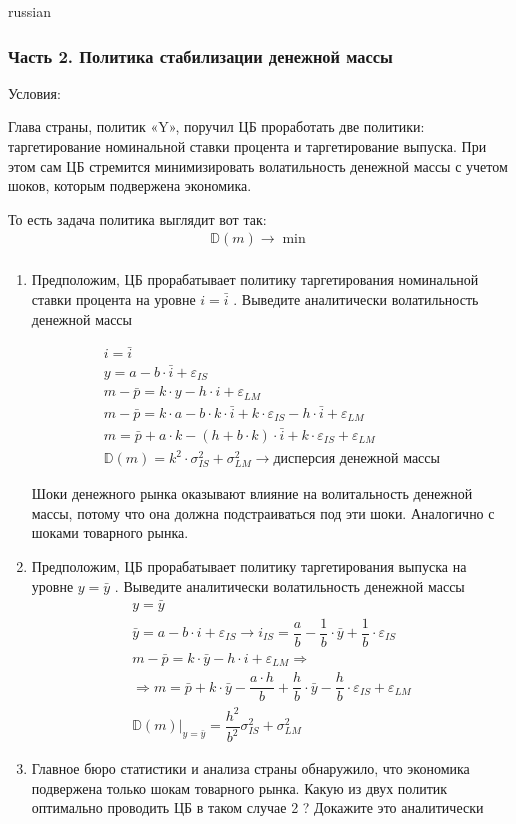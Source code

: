 \documentclass{article}
\begin{document}
\begin{otherlanguage*}{russian}
\subsubsection*{Часть 2. Политика стабилизации денежной массы}
Условия: 

Глава страны, политик «Y», поручил ЦБ проработать две политики: таргетирование номинальной
ставки процента и таргетирование выпуска. При этом сам ЦБ стремится минимизировать
волатильность денежной массы с учетом шоков, которым подвержена экономика.

То есть задача политика выглядит вот так: 
\begin{align*}
\mathbb{D} (m) \rightarrow \min \\
\end{align*}
\begin{enumerate}
\item Предположим, ЦБ прорабатывает политику таргетирования номинальной ставки процента на
уровне $ i = \bar{i} $ . Выведите аналитически волатильность денежной массы 

\begin{align*}
i = \bar{i} \\
y = a - b \cdot \bar{i} + \varepsilon_{IS} \\
m - \bar{p} = k \cdot y - h \cdot i + \varepsilon_{LM} \\
m - \bar{p} = k \cdot a - b \cdot k \cdot \bar{i} + k \cdot \varepsilon_{IS} - h \cdot \bar{i} + \varepsilon_{LM} \\
m = \bar{p} + a \cdot k - (h + b \cdot k ) \cdot \bar{i} + k \cdot \varepsilon_{IS} + \varepsilon_{LM} \\
\mathbb{D} (m) = k^2 \cdot \sigma^2_{IS} + \sigma^2_{LM} \rightarrow \text{дисперсия денежной массы} 
\end{align*}

Шоки денежного рынка оказывают влияние на волитальность денежной массы, потому что она должна подстраиваться под эти шоки. Аналогично с шоками товарного рынка.
\item Предположим, ЦБ прорабатывает политику таргетирования выпуска на уровне $ y = \bar{y} $ . Выведите аналитически волатильность денежной массы
\begin{align*}
y = \bar{y} \\
\bar{y} = a - b \cdot i + \varepsilon_{IS} \rightarrow i_{IS} = \dfrac{a}{b} - \dfrac{1}{b} \cdot \bar{y} + \dfrac{1}{b} \cdot \varepsilon_{IS} \\
m - \bar{p} = k \cdot \bar{y} - h \cdot i + \varepsilon_{LM} \Rightarrow \\
\Rightarrow m = \bar{p} + k \cdot \bar{y} - \dfrac{a \cdot h}{b} + \dfrac{h}{b} \cdot \bar{y} - \dfrac{h}{b} \cdot \varepsilon_{IS} + \varepsilon_{LM} \\
\mathbb{D} (m) |_{y = \bar{y}} = \dfrac{h^2}{b^2} \sigma^2_{IS} + \sigma^2_{LM} 
\end{align*}
\item Главное бюро статистики и анализа страны обнаружило, что экономика подвержена только
шокам товарного рынка. Какую из двух политик оптимально проводить ЦБ в таком случае 2 ?
Докажите это аналитически


\end{enumerate}
\end{otherlanguage*}
\end{document}
